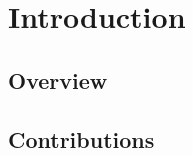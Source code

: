 \section{Introduction} \label{sec_intro}


\subsection{Overview}\label{sec:intro:overview}


\subsection{Contributions}\label{sec:intro:contributions}

